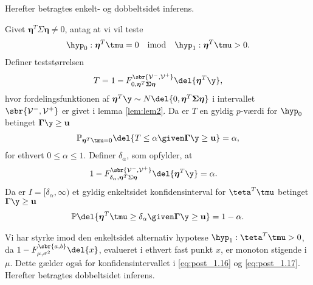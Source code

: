 Herefter betragtes enkelt- og dobbeltsidet inferens.
%
\begin{lem} \label{lem:lem3}
Givet \(\boldsymbol{\eta}^T \Sigma \boldsymbol{\eta} \neq 0\), antag at vi vil teste
\begin{align*}
\hyp_0: \boldsymbol{\eta}^T \tmu=0 \quad \text{imod} \quad \hyp_1: \boldsymbol{\eta}^T \tmu > 0.
\end{align*}
Definer teststørrelsen
\begin{align}
T=1- F_{0, \boldsymbol{\eta}^T \boldsymbol{\Sigma} \boldsymbol{\eta}}^{\sbr{\mathcal{V}^-, \mathcal{V}^+}} \del{\boldsymbol{\eta}^T \y}, \label{eq:post_1.14}
\end{align}
hvor fordelingsfunktionen af \(\boldsymbol{\eta}^T \y \sim N \del{0,  \boldsymbol{\eta}^T \boldsymbol{\Sigma} \boldsymbol{\eta}}\) i intervallet \(\sbr{\mathcal{V}^-, \mathcal{V}^+}\) er givet i lemma \ref{lem:lem2}.
Da er \(T\) en gyldig \(p\)-værdi for \(\hyp_0\) betinget \(\boldsymbol{\Gamma} \y \geq \mathbf{u}\)
\begin{align}
\mathbb{P}_{\boldsymbol{\eta}^T \tmu=0} \del{T \leq \alpha \given \boldsymbol{\Gamma }\y \geq \mathbf{u}} = \alpha, \label{eq:post_1.15}
\end{align}
for ethvert \(0 \leq \alpha \leq 1\). 
Definer \(\delta_{\alpha}\), som opfylder, at
\begin{align}
1-F_{\delta_{\alpha}, \boldsymbol{\eta}^T \Sigma \boldsymbol{\eta}}^{\sbr{\mathcal{V}^-, \mathcal{V}^+}} \del{\boldsymbol{\eta}^T \y} &= \alpha. \label{eq:post_1.16}
\end{align}
Da er \(I= [\delta_\alpha, \infty )\) et gyldig enkeltsidet konfidensinterval for \(\teta^T \tmu\) betinget \(\boldsymbol{\Gamma} \y \geq \mathbf{u}\)
\begin{align}
\mathbb{P} \del{\boldsymbol{\eta}^T \tmu \geq \delta_\alpha \given \boldsymbol{\Gamma} \y \geq \mathbf{u}} = 1- \alpha. \label{eq:post_1.17}
\end{align}
\end{lem}
%
Vi har styrke imod den enkeltsidet alternativ hypotese \(\hyp_1 : \teta^T \tmu > 0\), da \(1-F_{\mu, \sigma^2}^{\sbr{a,b}} \del{x}\), evalueret i ethvert fast punkt \(x\), er monoton stigende i \(\mu\).
Dette gælder også for konfidensintervallet i \eqref{eq:post_1.16} og \eqref{eq:post_1.17}.
Herefter betragtes dobbeltsidet inferens.
%

